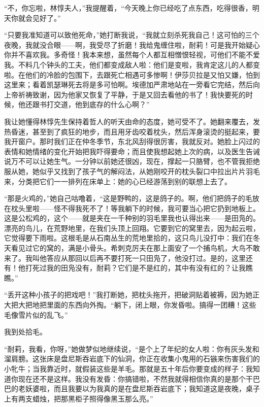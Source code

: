 \par “不，你忘啦，林惇夫人，”我提醒着，“今天晚上你已经吃了点东西，吃得很香，明天你就会见好了。”
\par “只要我准知道可以致他死命，”她打断我说，“我就立刻杀死我自己！这可怕的三个夜晚，我就没合眼——啊，我受尽了折磨！我给鬼缠住啦，耐莉！可是我开始疑心你并不喜欢我。多奇怪！我本来想，虽然每个人都互相憎恨轻视，可他们不能不爱我。不料几个钟头的工夫，他们都变成敌人啦：他们是变啦，我肯定这儿的人都变啦。在他们的冷脸的包围下，去跟死亡相遇可多惨啊！伊莎贝拉是又怕又嫌，怕到这里来；看着凯瑟琳死去将是多可怕啊。埃德加严肃地站在一旁看它完结，然后向上帝祈祷致谢，因为他家又恢复了平静，于是又回去看他的书了！我快要死的时候，他还跟书打交道，他到底存的什么心啊？”
\par 我让她懂得林惇先生保持着哲人的听天由命的态度，她可受不了。她翻来覆去，发热昏迷，甚至到了疯狂的地步，而且用牙齿咬着枕头，然后浑身滚烫的挺起来，要我开窗户。那时我们正在仲冬季节，东北风刮得很厉害，我就反对。她脸上闪过的表情和她情绪的变化开始把我吓得要命；而且使我想起她上次的病，以及医生告诫说万不可以让她生气。一分钟以前她还很凶，现在，撑起一只胳臂，也不管我拒绝服从她，她似乎又找到了孩子气的解闷法，从她刚咬开的枕头裂口中拉出片片羽毛来，分类把它们一一排列在床单上：她的心已经游荡到别的联想上去了。
\par “那是火鸡的，”她自己咕噜着，“这是野鸭的，这是鸽子的。啊，他们把鸽子的毛放在枕头里啦——怪不得我死不了！等我躺下的时候，我可要当心把它扔到地板上。这是公松鸡的，这个——就是夹在一千种别的羽毛里我也认得出来——是田凫的。漂亮的鸟儿，在荒野地里，在我们头顶上回翔。它要到它的窝里去，因为起云啦，它觉得要下雨啦。这根毛是从石南丛生的荒地里拾的，这只鸟儿没打中：我们在冬天看见过它的窝的，满是小骨头。希刺克厉夫在那上面安了一个捕鸟机，大鸟不敢来了。我叫他答应从那回以后再不要打死一只田凫了，他没打过。是的，这里还有！他打死过我的田凫没有，耐莉？它们是不是红的，其中有没有红的？让我瞧瞧。”
\par “丢开这种小孩子的把戏吧！”我打断她，把枕头拖开，把破洞贴着被褥，因为她正大把大把地把里面的东西向外掏。“躺下，闭上眼，你发昏啦。搞得一团糟！这些毛像雪片似的乱飞。”
\par 我到处拾毛。
\par “耐莉，我看，你呀，”她做梦似地继续说，“是个上了年纪的女人啦：你有灰头发和溜肩膀。这张床是盘尼斯吞岩底下的仙洞，你正在收集小鬼用的石镞来伤害我们的小牝牛；当我靠近时，就假装这些是羊毛。那就是五十年后你要变成的样子：我知道你现在还不是这样。我没有发昏：你搞错啦，不然我就得相信你真的是那个干巴巴的老妖婆啦，而且我要以为我真的是在盘尼斯吞岩底下；我知道这是夜晚，桌子上有两支蜡烛，把那黑柜子照得像黑玉那么亮。”
